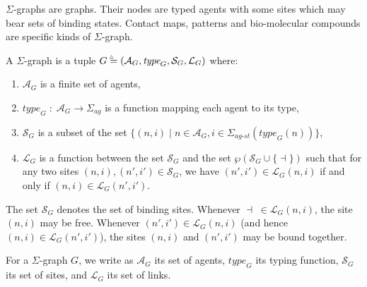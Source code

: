 \documentclass{entcs}
\newcommand{\freesymbol}{\dashv}
\newcommand{\graphsymb}{G}
\newcommand{\agentname}{\signaturesymb_{\textit{ag}}}
\newcommand{\linksite}{\signaturesymb_{\textit{ag-st}}}
\newcommand{\signaturesymb}{\Sigma}
\newcommand{\bydef}{\stackrel{\scalebox{0.8}{\!\!$\scriptscriptstyle{\triangle}$}}{=}}
\newcommand{\agents}[1][\graphsymb]{\mathcal{A}_{#1}}
\newcommand{\type}[1][\graphsymb]{\textit{type}_{#1}}
\newcommand{\sites}[1][\graphsymb]{\mathcal{S}_{#1}}
\newcommand{\links}[1][\graphsymb]{\mathcal{L}_{#1}}
\newcommand{\ext}{\{\freesymbol{}\}}
\newcommand{\graphtuple}[1][]{(\agents[#1],\type[#1],\sites[#1],\links[#1])}
\begin{document}
$\Sigma$-graphs are graphs. Their nodes are typed agents with some sites which may bear sets of binding states. Contact maps, patterns and bio-molecular compounds are specific kinds of $\Sigma$-graph.



\begin{defn}\label{def:summary}
A $\Sigma$-graph is a tuple $\graphsymb\bydef\graphtuple[G]$ where:
\begin{enumerate}
\item $\agents[G]$ is a finite set of agents,
\item $\type[G]\;:\;\agents\rightarrow \agentname$ is a function mapping each agent to its type,
\item $\sites[G]$ is a subset of the set $\{(n,i)\;|\; n\in \agents, i\in\linksite(\type[G](n))\}$,
\item $\links[G]$ is a function between the set $\sites$ and the set
 $\wp(\sites\cup\ext)$  such that for any two sites $(n,i),(n',i')\in\sites$, we have $(n',i')\in\links[G](n,i)$ if and only if $(n,i)\in\links[G](n',i')$.
\end{enumerate}
\end{defn}

The set $\sites$ denotes the set of binding sites.
Whenever $\freesymbol\;\in\links(n,i)$, the site $(n,i)$ may be free.
Whenever $(n',i')\in\links(n,i)$ (and hence $(n,i)\in\links(n',i')$), the sites $(n,i)$ and $(n',i')$ may be bound together.

For a $\Sigma$-graph $\graphsymb$, we write as $\agents[\graphsymb]$ its set of agents, $\type[\graphsymb]$ its typing function, $\sites[\graphsymb]$ its set of sites, and $\links[\graphsymb]$ its set of links.
\end{document}
